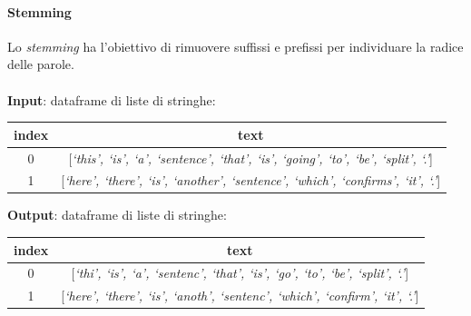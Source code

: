 \documentclass[12pt]{report}
\theoremstyle{definition}
\begin{document}
\paragraph{Stemming}
Lo \textit{stemming} ha l'obiettivo di rimuovere suffissi e prefissi per individuare la radice delle parole.
\\
\\
\textbf{Input}: dataframe di liste di stringhe:
\begin{center}
    \begin{tabular}{|c|c|}
    \hline
    \textbf{index} & \textbf{text} \\
    \hline
         0 & [\textit{`this', `is', `a', `sentence', `that', `is', `going', `to', `be', `split', `.'}]\\
         1 & [\textit{`here', `there', `is', `another', `sentence', `which', `confirms', `it', `.'}]\\
    \hline
    \end{tabular}
\end{center}
\textbf{Output}: dataframe di liste di stringhe:
\begin{center}
    \begin{tabular}{|c|c|}
    \hline
    \textbf{index} & \textbf{text} \\
    \hline
         0 & [\textit{`thi', `is', `a', `sentenc', `that', `is', `go', `to', `be', `split', `.'}]\\
         1 & [\textit{`here', `there', `is', `anoth', `sentenc', `which', `confirm', `it', `.'}]\\
    \hline
    \end{tabular}
\end{center}
\end{document}
